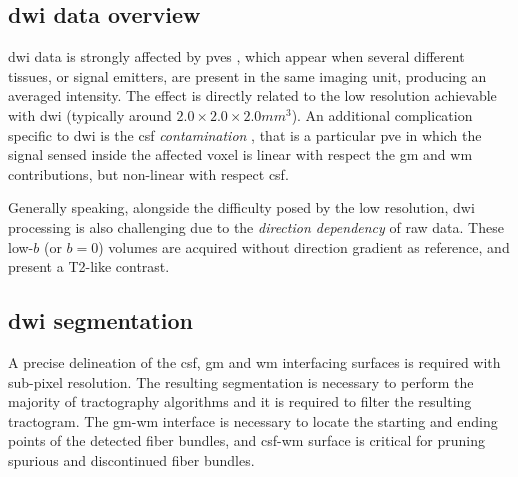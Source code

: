 \subsection{\gls{dwi} data overview}
\label{sec:dwi_overview}


\gls{dwi} data is strongly affected by \glspl{pve} \citep{alexander_analysis_2001},
which appear when several different tissues, or signal emitters, are present
in the same imaging unit, producing an averaged intensity. The effect is directly
related to the low resolution achievable with \gls{dwi} (typically around 
$2.0\times2.0\times2.0mm^3$). An additional complication specific to
\gls{dwi} is the \gls{csf} \emph{contamination} \citep{metzler-baddeley_how_2012},
that is a particular \gls{pve} in which the signal sensed inside the affected voxel is 
linear with respect the \gls{gm} and \gls{wm} contributions, but non-linear with
respect \gls{csf}.

Generally speaking, alongside the difficulty posed by the low resolution, \gls{dwi} 
processing is also challenging due to the \emph{direction dependency} of raw data.
These low-$b$ (or $b = 0$) volumes are acquired without direction gradient as reference, 
and present a T2-like contrast.



\subsection{\gls{dwi} segmentation}
\label{sec:dwi_segmentation}

A precise delineation of the \gls{csf}, \gls{gm} and \gls{wm} interfacing surfaces
is required with sub-pixel resolution.
The resulting segmentation is necessary to perform the majority of tractography 
algorithms and it is required to filter the resulting tractogram. The \gls{gm}-\gls{wm}
interface is necessary to locate the starting and ending points of the detected
fiber bundles, and \gls{csf}-\gls{wm} surface is critical for pruning spurious 
and discontinued fiber bundles.

